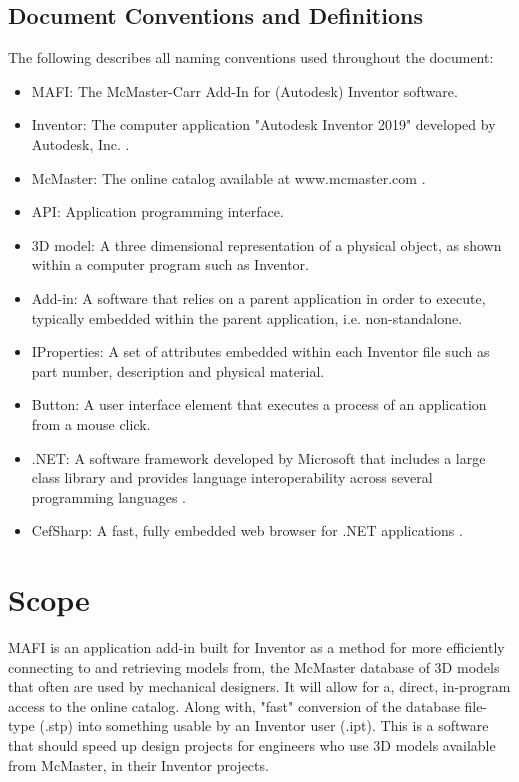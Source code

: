 \documentclass[12pt, letterpaper]{article}
\begin{document}
\subsection{Document Conventions and Definitions}
The following describes all naming conventions used throughout the document:
\begin{itemize}
    \item MAFI: The McMaster-Carr Add-In for (Autodesk) Inventor software.
    \item Inventor: The computer application "Autodesk Inventor 2019" developed by Autodesk, Inc. \cite{Inventor}.
    \item McMaster: The online catalog available at www.mcmaster.com \cite{McMaster}.
    \item API: Application programming interface.
    \item 3D model: A three dimensional representation of a physical object, as shown within a computer program such as Inventor.
    \item Add-in: A software that relies on a parent application in order to execute, typically embedded within the parent application, i.e. non-standalone.
    \item IProperties: A set of attributes embedded within each Inventor file such as part number, description and physical material.
    \item Button: A user interface element that executes a process of an application from a mouse click.
    \item .NET: A software framework developed by Microsoft that includes a large class library and provides language interoperability across several programming languages \cite{NET}.
    \item CefSharp: A fast, fully embedded web browser for .NET applications \cite{CEFSharp}.
\end{itemize}
\section{Scope}
MAFI is an application add-in built for Inventor as a method for more efficiently connecting to and retrieving models from, the 
McMaster database of 3D models that often are used by mechanical designers. 
It will allow for a, direct, in-program access to the online catalog. Along with, "fast" conversion of 
the database file-type (.stp) into something usable by an Inventor user (.ipt). This is a software that should speed 
up design projects for engineers who use 3D models available from McMaster, in their Inventor projects.
\end{document}
